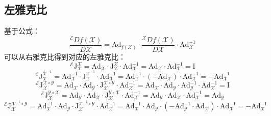\documentclass[12pt, onecolumn]{article}
\newcommand\normf{\fangsong}
\newcommand\bsm[1]{\boldsymbol{\mathrm{#1}}}
\begin{document}
	\subsection{\normf 左雅克比}
	基于公式：
	\begin{equation}
	\frac{{^\mathcal{E}Df(\mathcal{X})}}{D\mathcal{X}}=
	\bsm{Ad}_{f(\mathcal{X})}\cdot\frac{{^\mathcal{X}Df(\mathcal{X})}}{D\mathcal{X}}
	\cdot\bsm{Ad}_{\mathcal{X}}^{-1}
	\end{equation}
	可以从右雅克比得到对应的左雅克比：
	\begin{equation}
	^\mathcal{E}\bsm{J}_{\mathcal{X}}^{\mathcal{X}}
	=\bsm{Ad}_{\mathcal{X}}\cdot\bsm{J}_{\mathcal{X}}^{\mathcal{X}}\cdot\bsm{Ad}_{\mathcal{X}}^{-1}=\bsm{Ad}_{\mathcal{X}}\cdot\bsm{Ad}_{\mathcal{X}}^{-1}=\bsm{I}
	\end{equation}
	\begin{equation}
	^\mathcal{E}\bsm{J}_{\mathcal{X}}^{\mathcal{X}^{-1}}
	=\bsm{Ad}_{\mathcal{X}}^{-1}\cdot\bsm{J}_{\mathcal{X}}^{\mathcal{X}^{-1}}\cdot\bsm{Ad}_{\mathcal{X}}^{-1}
	=\bsm{Ad}_{\mathcal{X}}^{-1}\cdot\left( -\bsm{Ad}_{\mathcal{X}}\right) \cdot\bsm{Ad}_{\mathcal{X}}^{-1}=-\bsm{Ad}_{\mathcal{X}}^{-1}
	\end{equation}
	\begin{equation}
	^\mathcal{E}\bsm{J}_{\mathcal{X}}^{\mathcal{X}\circ\mathcal{Y}}
	=\bsm{Ad}_{\mathcal{X}}\cdot\bsm{Ad}_{\mathcal{Y}}\cdot
	\bsm{J}_{\mathcal{X}}^{\mathcal{X}\circ\mathcal{Y}}\cdot\bsm{Ad}_{\mathcal{X}}^{-1}
	=\bsm{Ad}_{\mathcal{X}}\cdot\bsm{Ad}_{\mathcal{Y}}\cdot
	\bsm{Ad}_{\mathcal{Y}}^{-1}\cdot\bsm{Ad}_{\mathcal{X}}^{-1}=\bsm{I}
	\end{equation}
	\begin{equation}
	^\mathcal{E}\bsm{J}_{\mathcal{X}}^{\mathcal{Y}\circ\mathcal{X}}
	=\bsm{Ad}_{\mathcal{Y}}\cdot\bsm{Ad}_{\mathcal{X}}\cdot
	\bsm{J}_{\mathcal{X}}^{\mathcal{Y}\circ\mathcal{X}}\cdot\bsm{Ad}_{\mathcal{X}}^{-1}
	=\bsm{Ad}_{\mathcal{Y}}\cdot\bsm{Ad}_{\mathcal{X}}\cdot
	\bsm{Ad}_{\mathcal{X}}^{-1}=\bsm{Ad}_{\mathcal{Y}}
	\end{equation}
	\begin{equation}
	^\mathcal{E}\bsm{J}_{\mathcal{X}}^{\mathcal{X}^{-1}\circ\mathcal{Y}}
	=\bsm{Ad}_{\mathcal{X}}^{-1}\cdot\bsm{Ad}_{\mathcal{Y}}\cdot
	\bsm{J}_{\mathcal{X}}^{\mathcal{X}^{-1}\circ\mathcal{Y}}\cdot\bsm{Ad}_{\mathcal{X}}^{-1}
	=\bsm{Ad}_{\mathcal{X}}^{-1}\cdot\bsm{Ad}_{\mathcal{Y}}\cdot
	\left( -\bsm{Ad}_{\mathcal{Y}}^{-1}\cdot\bsm{Ad}_{\mathcal{X}}\right) \cdot\bsm{Ad}_{\mathcal{X}}^{-1}=-\bsm{Ad}_{\mathcal{X}}^{-1}
	\end{equation}
\end{document}
